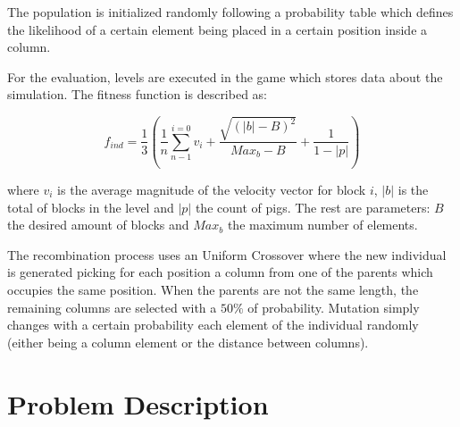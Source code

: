 \documentclass[runningheads,a4paper]{llncs}
\begin{document}
The population is initialized randomly following a probability table which 
defines the likelihood of a certain element being placed in a certain position 
inside a column.

For the evaluation, levels are executed in the game which stores data about the 
simulation. The fitness function is described as:

$$ f_{ind} = \frac{1}{3}(\frac{1}{n} 
\sum_{n-1}^{i=0}{v_i}+\frac{\sqrt{(|b|-B)^2}}{Max_b-B}+ \frac{1}{1-|p|})$$ 

where $v_i$ is the average magnitude of the velocity vector for block $i$, 
$|b|$ is the total of blocks in the level and $|p|$ the count of pigs. The rest 
are parameters: $B$ the desired amount of blocks and $Max_b$ the maximum number 
of elements.

The recombination process uses an Uniform Crossover where the new individual is 
generated picking for each position a column from one of the parents which 
occupies the same position. When the parents are not the same length, the 
remaining columns are selected with a $50\%$ of probability. Mutation simply 
changes with a certain probability each element of the individual randomly 
(either being a column element or the distance between columns).


\section{Problem Description}
\label{sec:torcs}


\end{document}
